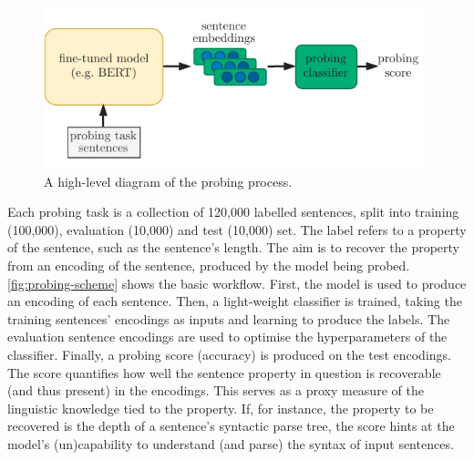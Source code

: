 \documentclass[bsc,frontabs,twoside,singlespacing,parskip,deptreport]{infthesis}
\begin{document}
{{    \begin{figure}[h!t]
      \centering
      \includegraphics[width=11cm]{graphics/probing-scheme}
      \caption{A high-level diagram of the probing process.}
      \label{fig:probing-scheme}
    \end{figure}

    Each probing task is a collection of 120,000 labelled sentences, split into training (100,000), evaluation (10,000) and test (10,000) set. The label refers to a property of the sentence, such as the sentence's length. The aim is to recover the property from an encoding of the sentence, produced by the model being probed. \autoref{fig:probing-scheme} shows the basic workflow. First, the model is used to produce an encoding of each sentence. Then, a light-weight classifier is trained, taking the training sentences' encodings as inputs and learning to produce the labels. The evaluation sentence encodings are used to optimise the hyperparameters of the classifier. Finally, a probing score (accuracy) is produced on the test encodings. The score quantifies how well the sentence property in question is recoverable (and thus present) in the encodings. This serves as a proxy measure of the linguistic knowledge tied to the property. If, for instance, the property to be recovered is the depth of a sentence's syntactic parse tree, the score hints at the model's (un)capability to understand (and parse) the syntax of input sentences.

}}
\end{document}
